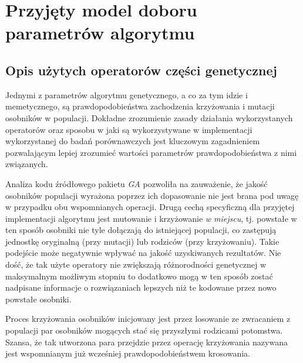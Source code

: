 \newpage
\chapter{Przyjęty model doboru parametrów algorytmu}
\label{ch:przyjety_model_doboru_parametrow_algorytmu}
\section{Opis użytych operatorów części genetycznej}
\par
Jednymi z parametrów algorytmu genetycznego, a co za tym idzie i memetycznego, są prawdopodobieństwa zachodzenia krzyżowania i mutacji osobników w populacji. Dokładne zrozumienie zasady działania wykorzystanych operatorów oraz sposobu w jaki są wykorzystywane w implementacji wykorzystanej do badań porównawczych jest kluczowym zagadnieniem pozwalającym lepiej zrozumieć wartości parametrów prawdopodobieństwa z nimi związanych. 
\par 
Analiza kodu źródłowego pakietu \emph{GA} \cite{gaPackage} pozwoliła na zauważenie, że jakość osobników populacji wyrażona poprzez ich dopasowanie nie jest brana pod uwagę w przypadku obu wspomnianych operacji. Drugą cechą specyficzną dla przyjętej implementacji algorytmu jest mutowanie i krzyżowanie \emph{w miejscu}, tj. powstałe w ten sposób osobniki nie tyle dołączają do istniejącej populacji, co zastępują jednostkę oryginalną (przy mutacji) lub rodziców (przy krzyżowaniu). Takie podejście może negatywnie wpływać na jakość uzyskiwanych rezultatów. Nie dość, że tak użyte operatory nie zwiększają różnorodności genetycznej w maksymalnym możliwym stopniu to dodatkowo mogą w ten sposób zostać nadpisane informacje o rozwiązaniach lepszych niż te kodowane przez nowo powstałe osobniki.
\par
Proces krzyżowania osobników inicjowany jest przez losowanie ze zwracaniem z populacji par osobników mogących stać się przyszłymi rodzicami potomstwa. Szansa, że tak utworzona para przejdzie przez operację krzyżowania nazywana jest wspomnianym już wcześniej prawdopodobieństwem krosowania. 
